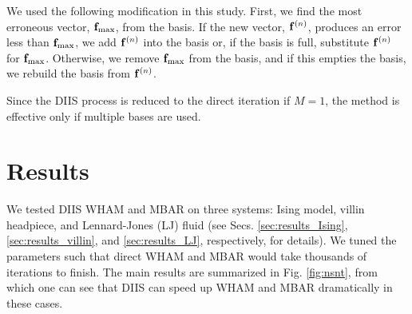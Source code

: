 \documentclass[reprint,aip,jcp,superscriptaddress]{revtex4-1}
\begin{document}
We used the following modification
in this study.
%
%
%
%
First, we find the most erroneous vector,
$\mathbf{f}_\mathrm{max}$, from the basis.
%
If the new vector, $\mathbf{f}^{(n)}$,
produces an error less than $\mathbf{f}_\mathrm{max}$,
we add $\mathbf{f}^{(n)}$ into the basis
or, if the basis is full,
substitute $\mathbf{f}^{(n)}$ for $\mathbf{f}_\mathrm{max}$.
%
Otherwise,
we remove $\mathbf{f}_\mathrm{max}$ from the basis,
and if this empties the basis,
we rebuild the basis from $\mathbf{f}^{(n)}$.



Since the DIIS process is reduced
to the direct iteration
if $M = 1$,
the method is effective
only if multiple bases are used.
%




\section{Results}





We tested DIIS WHAM and MBAR on three systems:
Ising model,
villin headpiece,
and
Lennard-Jones (LJ) fluid
(see Secs.
\ref{sec:results_Ising},
\ref{sec:results_villin},
and
\ref{sec:results_LJ},
respectively,
for details).
%
We tuned the parameters
such that direct WHAM and MBAR
would take thousands of iterations
to finish.
%
The main results
are summarized
in Fig. \ref{fig:nsnt},
from which one can see that
DIIS can speed up WHAM and MBAR
dramatically in these cases.
\end{document}
